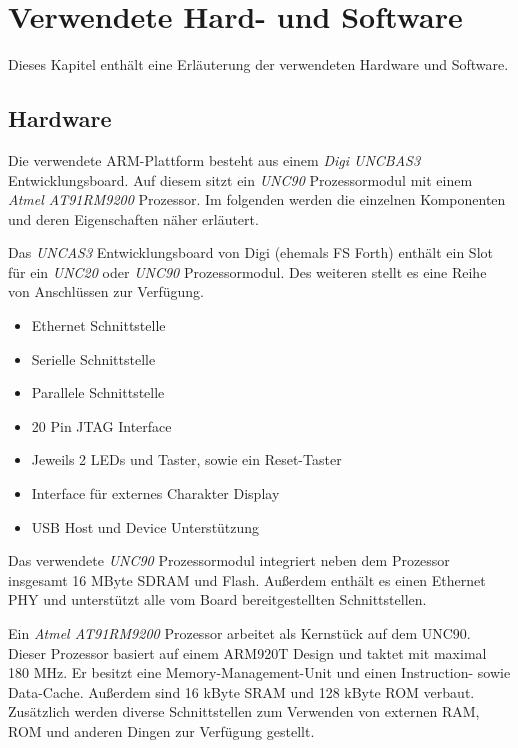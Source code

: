 \documentclass[
  a4paper,					%
  twoside,
  DIV=calc,     				%
  bibliography=totoc,
  cleardoublepage=empty,
  ngerman,     					%
  final       					%
]{scrbook}
\begin{document}
\chapter{Verwendete Hard- und Software}
\label{sec:HardSoftware}
Dieses Kapitel enthält eine Erläuterung der verwendeten Hardware und Software.


\section{Hardware}
\label{sec:hardware}
Die verwendete ARM-Plattform besteht aus einem \emph{Digi UNCBAS3} Entwicklungsboard. Auf diesem sitzt ein \emph{UNC90} Prozessormodul mit einem \emph{Atmel AT91RM9200} Prozessor. Im folgenden werden die einzelnen Komponenten und deren Eigenschaften näher erläutert.

Das \emph{UNCAS3} Entwicklungsboard von Digi (ehemals FS Forth) enthält ein Slot für ein \emph{UNC20} oder \emph{UNC90} Prozessormodul. Des weiteren stellt es eine Reihe von Anschlüssen zur Verfügung.

\begin{itemize}
	\item Ethernet Schnittstelle
	\item Serielle Schnittstelle
	\item Parallele Schnittstelle
	\item 20 Pin JTAG Interface
	\item Jeweils 2 LEDs und Taster, sowie ein Reset-Taster
	\item Interface für externes Charakter Display
	\item USB Host und Device Unterstützung
\end{itemize}

Das verwendete \emph{UNC90} Prozessormodul integriert neben dem Prozessor insgesamt 16 MByte SDRAM und Flash. Außerdem enthält es einen Ethernet PHY und unterstützt alle vom Board bereitgestellten Schnittstellen.

Ein \emph{Atmel AT91RM9200} Prozessor arbeitet als Kernstück auf dem UNC90. Dieser Prozessor basiert auf einem ARM920T Design und taktet mit maximal 180 MHz. Er besitzt eine Memory-Management-Unit und einen Instruction- sowie Data-Cache. Außerdem sind 16 kByte SRAM und 128 kByte ROM verbaut. Zusätzlich werden diverse Schnittstellen zum Verwenden von externen RAM, ROM und anderen Dingen zur Verfügung gestellt.
\end{document}
